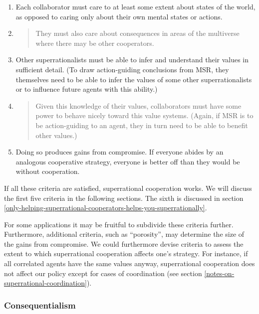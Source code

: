 \begin{enumerate}
\def\labelenumi{\arabic{enumi}.}
\item
  Each collaborator must care to at least some extent about states of
  the world, as opposed to caring only about their own mental states or
  actions.
\item
  \begin{quote}
  They must also care about consequences in areas of the multiverse
  where there may be other cooperators.
  \end{quote}
\item
  Other superrationalists must be able to infer and understand their
  values in sufficient detail. (To draw action-guiding conclusions from
  MSR, they themselves need to be able to infer the values of some other
  superrationalists or to influence future agents with this ability.)
\item
  \begin{quote}
  Given this knowledge of their values, collaborators must have some
  power to behave nicely toward this value systems. (Again, if MSR is to
  be action-guiding to an agent, they in turn need to be able to benefit
  other values.)
  \end{quote}
\item
  Doing so produces gains from compromise. If everyone abides by an
  analogous cooperative strategy, everyone is better off than they would
  be without cooperation.
\end{enumerate}

If all these criteria are satisfied, superrational cooperation works. We
will discuss the first five criteria in the following sections. The
sixth is discussed in section
\ref{only-helping-superrational-cooperators-helps-you-superrationally}.

For some applications it may be fruitful to subdivide these criteria
further. Furthermore, additional criteria, such as
\parencite{Bostrom2014-gy} ``porosity'', may determine the
size of the gains from compromise. We could furthermore devise criteria
to assess the extent to which superrational cooperation affects one's
strategy. For instance, if all correlated agents have the same values
anyway, superrational cooperation does not affect our policy except for
cases of coordination (see section
\ref{notes-on-superrational-coordination}).

\hypertarget{consequentialism}{\subsubsection{Consequentialism}\label{consequentialism}}

